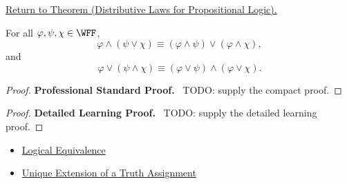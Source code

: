 \newpage
{}
\label{prf:distributive-laws-propositional-logic}

\begin{remark*}[Return]
\hyperref[thm:distributive-laws-propositional-logic]{Return to Theorem (Distributive Laws for Propositional Logic).}
\end{remark*}

\begin{theorem*}
For all \(\varphi,\psi,\chi\in\WFF\),
\[
\varphi\land(\psi\lor\chi)
\equiv
(\varphi\land\psi)\lor(\varphi\land\chi),
\]
and
\[
\varphi\lor(\psi\land\chi)
\equiv
(\varphi\lor\psi)\land(\varphi\lor\chi).
\]
\end{theorem*}

\begin{proof}
\textbf{Professional Standard Proof.}~
TODO: supply the compact proof.
\end{proof}

\begin{proof}
\textbf{Detailed Learning Proof.}~
TODO: supply the detailed learning proof.
\end{proof}

\begin{remark*}
\end{remark*}

\begin{dependencies}
\begin{itemize}
  \item \hyperref[def:logical-equivalence-propositional-logic]{Logical Equivalence}
  \item \hyperref[thm:unique-extension-truth-assignment-propositional-logic]{Unique Extension of a Truth Assignment}
\end{itemize}
\end{dependencies}

\clearpage
